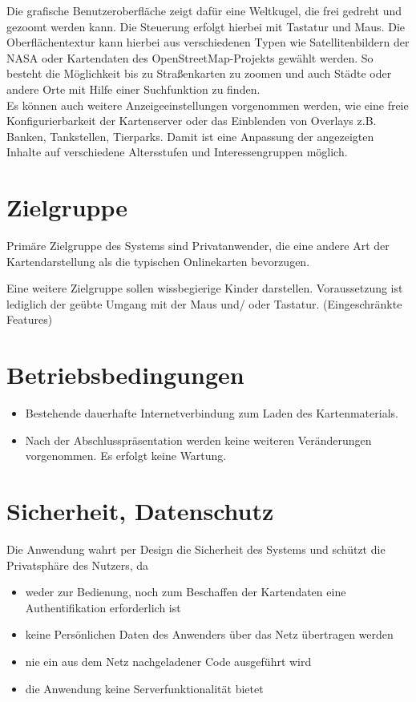 \documentclass[10pt]{scrreprt}
\begin{document}
Die grafische Benutzeroberfläche zeigt dafür eine Weltkugel, die frei gedreht und gezoomt werden kann. Die Steuerung erfolgt hierbei mit Tastatur und Maus. Die Oberflächentextur kann hierbei aus verschiedenen Typen wie Satellitenbildern der NASA oder Kartendaten des OpenStreetMap-Projekts gewählt werden. 
So besteht die Möglichkeit bis zu Straßenkarten zu zoomen und auch Städte oder andere Orte mit Hilfe einer Suchfunktion zu finden. \\

Es können auch weitere Anzeigeeinstellungen vorgenommen werden, wie eine freie Konfigurierbarkeit der Kartenserver oder das Einblenden von Overlays z.B. Banken, Tankstellen, Tierparks.  
Damit ist eine Anpassung der angezeigten Inhalte auf verschiedene Altersstufen und Interessengruppen möglich.


\section{Zielgruppe}
Primäre Zielgruppe des Systems sind Privatanwender, die eine andere Art der Kartendarstellung als die typischen Onlinekarten bevorzugen.

Eine weitere Zielgruppe sollen wissbegierige Kinder darstellen. Voraussetzung ist lediglich der geübte Umgang mit der Maus und/ oder Tastatur. (Eingeschränkte Features)

\section{Betriebsbedingungen}
\begin{itemize}
\item Bestehende dauerhafte Internetverbindung zum Laden des Kartenmaterials.
\item Nach der Abschlusspräsentation werden keine weiteren 
Veränderungen vorgenommen. Es erfolgt keine Wartung.
\end{itemize} 

\section{Sicherheit, Datenschutz}
Die Anwendung wahrt per Design die Sicherheit des Systems und schützt die Privatsphäre des Nutzers, da
\begin{itemize}
\item weder zur Bedienung, noch zum Beschaffen der Kartendaten eine Authentifikation erforderlich ist
\item keine Persönlichen Daten des Anwenders über das Netz übertragen werden
\item nie ein aus dem Netz nachgeladener Code ausgeführt wird
\item die Anwendung keine Serverfunktionalität bietet
\end{itemize}
\end{document}
